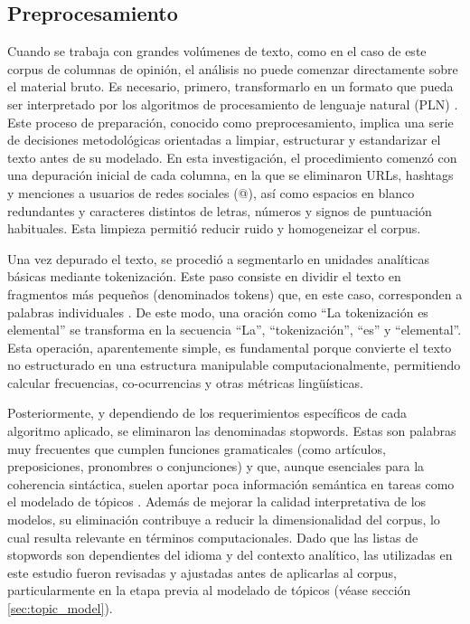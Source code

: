 \documentclass[11pt,a4paper]{article}
\begin{document}
	\subsection{Preprocesamiento}

		Cuando se trabaja con grandes volúmenes de texto, como en el caso de este corpus de columnas de opinión, el análisis no puede comenzar directamente sobre el material bruto. Es necesario, primero, transformarlo en un formato que pueda ser interpretado por los algoritmos de procesamiento de lenguaje natural (PLN) \cite{Chai2022}. Este proceso de preparación, conocido como preprocesamiento, implica una serie de decisiones metodológicas orientadas a limpiar, estructurar y estandarizar el texto antes de su modelado. En esta investigación, el procedimiento comenzó con una depuración inicial de cada columna, en la que se eliminaron URLs, hashtags y menciones a usuarios de redes sociales (@), así como espacios en blanco redundantes y caracteres distintos de letras, números y signos de puntuación habituales. Esta limpieza permitió reducir ruido y homogeneizar el corpus.

		Una vez depurado el texto, se procedió a segmentarlo en unidades analíticas básicas mediante tokenización. Este paso consiste en dividir el texto en fragmentos más pequeños (denominados tokens) que, en este caso, corresponden a palabras individuales \cite{Tyagi_text}. De este modo, una oración como “La tokenización es elemental” se transforma en la secuencia “La”, “tokenización”, “es” y “elemental”. Esta operación, aparentemente simple, es fundamental porque convierte el texto no estructurado en una estructura manipulable computacionalmente, permitiendo calcular frecuencias, co-ocurrencias y otras métricas lingüísticas.
		

		Posteriormente, y dependiendo de los requerimientos específicos de cada algoritmo aplicado, se eliminaron las denominadas stopwords. Estas son palabras muy frecuentes que cumplen funciones gramaticales (como artículos, preposiciones, pronombres o conjunciones) y que, aunque esenciales para la coherencia sintáctica, suelen aportar poca información semántica en tareas como el modelado de tópicos \cite{Siino2024}. Además de mejorar la calidad interpretativa de los modelos, su eliminación contribuye a reducir la dimensionalidad del corpus, lo cual resulta relevante en términos computacionales. Dado que las listas de stopwords son dependientes del idioma y del contexto analítico, las utilizadas en este estudio fueron revisadas y ajustadas antes de aplicarlas al corpus, particularmente en la etapa previa al modelado de tópicos (véase sección \ref{sec:topic_model}).
		
\end{document}
